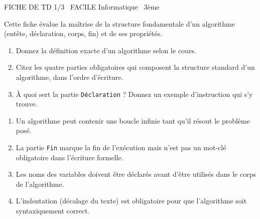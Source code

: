 \documentclass[11pt]{article}
\begin{document}
\begin{tcolorbox}[enhanced,colback=popink,colframe=popink,arc=10pt,boxrule=0pt,left=12pt,right=12pt,top=9pt,bottom=9pt]
{\color{white}\popxbold\small FICHE DE TD 1/3 \textbullet\ FACILE \hfill Informatique \textbullet\ 3ème\par}
\end{tcolorbox}
\vspace{4pt}
Cette fiche évalue la maîtrise de la structure fondamentale d'un algorithme (entête, déclaration, corps, fin) et de ses propriétés.

\begin{exercice}
\begin{enumerate}
    \item Donnez la définition exacte d'un algorithme selon le cours.
    \item Citez les quatre parties obligatoires qui composent la structure standard d'un algorithme, dans l'ordre d'écriture.
    \item À quoi sert la partie \texttt{Déclaration} ? Donnez un exemple d'instruction qui s'y trouve.
\end{enumerate}
\end{exercice}

\begin{exercice}
\begin{enumerate}
    \item Un algorithme peut contenir une boucle infinie tant qu'il résout le problème posé.
    \item La partie \texttt{Fin} marque la fin de l'exécution mais n'est pas un mot-clé obligatoire dans l'écriture formelle.
    \item Les noms des variables doivent être déclarés avant d'être utilisés dans le corps de l'algorithme.
    \item L'indentation (décalage du texte) est obligatoire pour que l'algorithme soit syntaxiquement correct.
\end{enumerate}
\end{exercice}
\end{document}
